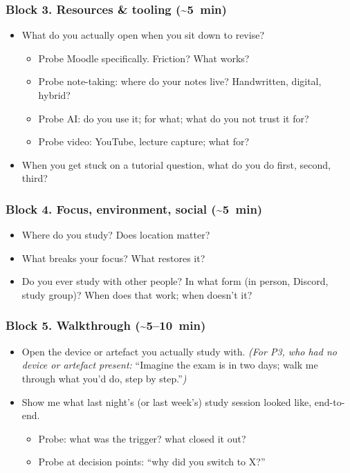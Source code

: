 \documentclass[a4paper,11pt]{article}
\begin{document}
\subsubsection*{Block 3. Resources \& tooling (\textasciitilde5~min)}
\begin{itemize}[leftmargin=1.2em,itemsep=2pt]
    \item What do you actually open when you sit down to revise?
        \begin{itemize}[leftmargin=1em]
            \item Probe Moodle specifically. Friction? What works?
            \item Probe note-taking: where do your notes live?
                  Handwritten, digital, hybrid?
            \item Probe AI: do you use it; for what; what do you not
                  trust it for?
            \item Probe video: YouTube, lecture capture; what for?
        \end{itemize}
    \item When you get stuck on a tutorial question, what do you do
          first, second, third?
\end{itemize}

\subsubsection*{Block 4. Focus, environment, social (\textasciitilde5~min)}
\begin{itemize}[leftmargin=1.2em,itemsep=2pt]
    \item Where do you study? Does location matter?
    \item What breaks your focus? What restores it?
    \item Do you ever study with other people? In what form (in person,
          Discord, study group)? When does that work; when doesn't it?
\end{itemize}

\subsubsection*{Block 5. Walkthrough (\textasciitilde5--10~min)}
\begin{itemize}[leftmargin=1.2em,itemsep=2pt]
    \item Open the device or artefact you actually study with.
          \emph{(For P3, who had no device or artefact present:}
          ``Imagine the exam is in two days; walk me through what you'd
          do, step by step.''\emph{)}
    \item Show me what last night's (or last week's) study session
          looked like, end-to-end.
        \begin{itemize}[leftmargin=1em]
            \item Probe: what was the trigger? what closed it out?
            \item Probe at decision points: ``why did you switch to
                  X?''
        \end{itemize}
\end{itemize}
\end{document}
